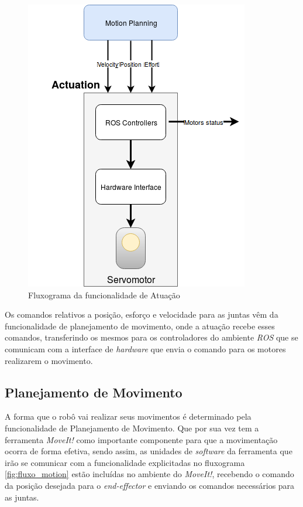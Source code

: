 \begin{figure}[H]
	\centering
	\includegraphics[scale=0.5]{Figures/actuation_depen.png}
	\caption{Fluxograma da funcionalidade de Atuação}
	\label{fig:flux_atu}
\end{figure}

Os comandos relativos a posição, esforço e velocidade para as juntas vêm da funcionalidade de planejamento de movimento, onde a atuação recebe esses comandos, transferindo os mesmos para os controladores do ambiente \textit{ROS} que se comunicam com a interface de \textit{hardware} que envia o comando para os motores realizarem o movimento.
\subsection{Planejamento de Movimento}\label{sec:plan_mov}
A forma que o robô vai realizar seus movimentos é determinado pela funcionalidade de Planejamento de Movimento. Que por sua vez tem a ferramenta \textit{MoveIt!} como importante componente para que a movimentação ocorra de forma efetiva, sendo assim, as unidades de \textit{software} da ferramenta que irão se comunicar com a funcionalidade explicitadas no fluxograma \ref{fig:fluxo_motion} estão incluídas no ambiente do \textit{MoveIt!}, recebendo o comando da posição desejada para o \textit{end-effector} e enviando os comandos necessários para as juntas. 
	
